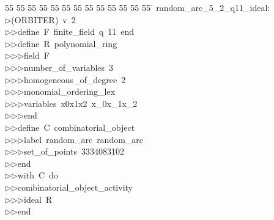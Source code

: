 %
%
\begin{tabbing}
55 \= 55 \= 55 \= 55 \= 55 \= 55 \= 55 \= 55 \= 55 \= 55 \= 55 \= 55 \= 55 \= \kill
random\_arc\_5\_2\_q11\_ideal:\\[0pt]
$\triangleright$\>(ORBITER)\ v\ 2\ \\[0pt]
$\triangleright$\>$\triangleright$\>define\ F\ finite\_field\ q\ 11\ end\ \\[0pt]
$\triangleright$\>$\triangleright$\>define\ R\ polynomial\_ring\ \\[0pt]
$\triangleright$\>$\triangleright$\>$\triangleright$\>field\ F\ \\[0pt]
$\triangleright$\>$\triangleright$\>$\triangleright$\>number\_of\_variables\ 3\ \\[0pt]
$\triangleright$\>$\triangleright$\>$\triangleright$\>homogeneous\_of\_degree\ 2\ \\[0pt]
$\triangleright$\>$\triangleright$\>$\triangleright$\>monomial\_ordering\_lex\ \\[0pt]
$\triangleright$\>$\triangleright$\>$\triangleright$\>variables\ x0x1x2\ x\_0x\_1x\_2\ \\[0pt]
$\triangleright$\>$\triangleright$\>$\triangleright$\>end\ \\[0pt]
$\triangleright$\>$\triangleright$\>define\ C\ combinatorial\_object\ \\[0pt]
$\triangleright$\>$\triangleright$\>$\triangleright$\>label\ random\_arc\ random\_arc\ \\[0pt]
$\triangleright$\>$\triangleright$\>$\triangleright$\>set\_of\_points\ 3334083102\ \\[0pt]
$\triangleright$\>$\triangleright$\>end\ \\[0pt]
$\triangleright$\>$\triangleright$\>with\ C\ do\ \\[0pt]
$\triangleright$\>$\triangleright$\>combinatorial\_object\_activity\ \\[0pt]
$\triangleright$\>$\triangleright$\>$\triangleright$\>ideal\ R\ \\[0pt]
$\triangleright$\>$\triangleright$\>end\\[0pt]
\end{tabbing}
